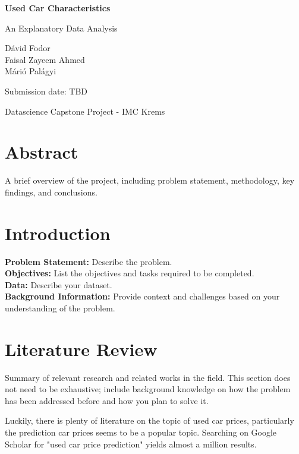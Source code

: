 \documentclass[12pt]{article}
\begin{document}
\begin{titlepage}
  \centering
  \vspace*{1in}
  {\Huge\bfseries Used Car Characteristics\par}
  \vspace{0.5em}
  {\Large An Explanatory Data Analysis\par}
  \vspace{1.5in}
  {\Large Dávid Fodor \\ Faisal Zayeem Ahmed \\ Márió Palágyi\par}
  \vfill
  {\large Submission date: TBD\par}
  \vspace{0.5in}
  {\large Datascience Capstone Project - IMC Krems}  %
\end{titlepage}

\section*{Abstract}
A brief overview of the project, including problem statement, methodology, key findings, and conclusions.

\section{Introduction}
\textbf{Problem Statement:} Describe the problem.\\[1ex]
\textbf{Objectives:} List the objectives and tasks required to be completed.\\[1ex]
\textbf{Data:} Describe your dataset.\\[1ex]
\textbf{Background Information:} Provide context and challenges based on your understanding of the problem.

\section{Literature Review}
Summary of relevant research and related works in the field. This section does not need to be exhaustive; include background knowledge on how the problem has been addressed before and how you plan to solve it.

Luckily, there is plenty of literature on the topic of used car prices, particularly the prediction car prices seems to be a popular topic. Searching on Google Scholar for "used car price prediction" yields almost a million results.
\end{document}
